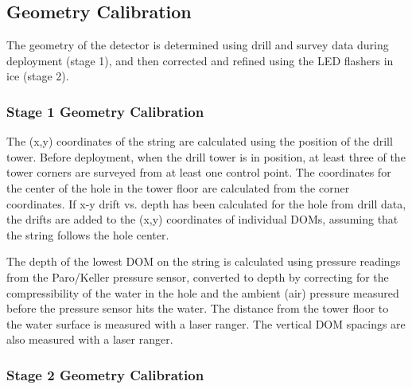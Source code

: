 \subsection{Geometry Calibration}

The geometry of the detector is determined using drill and survey data
during deployment (stage 1), and then corrected and refined using the LED
flashers in ice (stage 2).
\subsubsection{Stage 1 Geometry Calibration}
The (x,y) coordinates of the string are calculated using the position
of the drill tower. Before deployment, when the drill tower is in position, at least three
of the tower corners are surveyed from at least one control point.
The coordinates for the center of the hole in the tower floor are
calculated from the corner coordinates. If x-y drift vs. depth has been calculated for the hole from drill
data, the drifts are added to the (x,y) coordinates of individual
DOMs, assuming that the string follows the hole center.

The depth of the lowest DOM on the string is calculated using pressure
readings from the Paro/Keller pressure sensor, converted to depth by correcting
for the compressibility of the water in the hole and the ambient (air)
pressure measured before the pressure sensor hits the water. The
distance from the tower floor to the water surface is measured with a
laser ranger. The vertical DOM spacings are also measured with a laser
ranger.

\subsubsection{Stage 2 Geometry Calibration}

